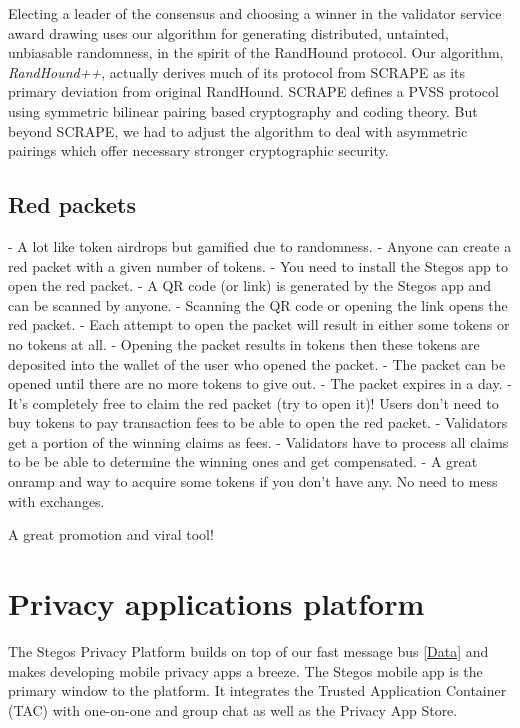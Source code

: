 \documentclass[a4paper, 10pt, conference]{ieeeconf}
\begin{document}
Electing a leader of the consensus and choosing a winner in the validator service award drawing uses our algorithm for generating distributed, untainted, unbiasable randomness, in the spirit of the RandHound protocol\cite{c12}. Our algorithm, \textit{RandHound++}, actually derives much of its protocol from SCRAPE\cite{c13} as its primary deviation from original RandHound. SCRAPE defines a PVSS\cite{c14} protocol using symmetric bilinear pairing based cryptography and coding theory. But beyond SCRAPE, we had to adjust the algorithm to deal with asymmetric pairings which offer necessary stronger cryptographic security.

\subsection{Red packets}\label{RedPackets}

- A lot like token airdrops but gamified due to randomness.
- Anyone can create a red packet with a given number of tokens.
- You need to install the Stegos app to open the red packet.
- A QR code (or link) is generated by the Stegos app and can be scanned by anyone. 
- Scanning the QR code or opening the link opens the red packet.
- Each attempt to open the packet will result in either some tokens or no tokens at all.
- Opening the packet results in tokens then these tokens are deposited into the wallet of the user who opened the packet.
- The packet can be opened until there are no more tokens to give out.
- The packet expires in a day.
- It's completely free to claim the red packet (try to open it)! Users don't need to buy tokens to pay transaction fees to be able to open the red packet.
- Validators get a portion of the winning claims as fees. 
- Validators have to process all claims to be be able to determine the winning ones and get compensated. 
- A great onramp and way to acquire some tokens if you don't have any. No need to mess with exchanges.

A great promotion and viral tool!

\section{Privacy applications platform}\label{PrivacyPlatform}

The Stegos Privacy Platform builds on top of our fast message bus \ref{Data} and makes developing mobile privacy apps a breeze. The Stegos mobile app is the primary window to the platform. It integrates the Trusted Application Container (TAC) with one-on-one and group chat as well as the  Privacy App Store. 
\end{document}
